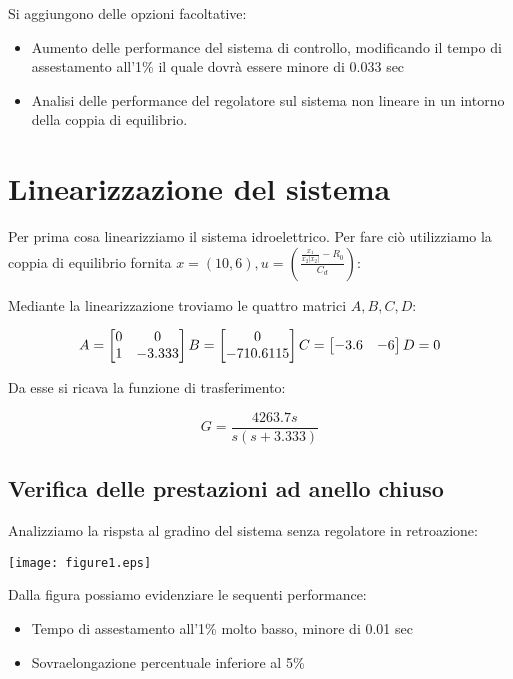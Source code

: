 \documentclass{article}
\begin{document}
Si aggiungono delle opzioni facoltative:
\begin{itemize}
    \item Aumento delle performance del sistema di controllo, modificando il tempo di assestamento all'1\% il quale dovrà essere minore di 0.033 sec
    \item Analisi delle performance del regolatore sul sistema non lineare in un intorno della coppia di equilibrio.
\end{itemize}

\section{Linearizzazione del sistema}

Per prima cosa linearizziamo il sistema idroelettrico. Per fare ciò utilizziamo la coppia di equilibrio fornita $x=(10,6), u=(\frac{\frac{x_1}{x_2 |x_2|}-R_0}{C_d})$:

Mediante la linearizzazione troviamo le quattro matrici $A,B,C,D$:

$$
A=
\begin{bmatrix}
    0 & 0\\
    1 & -3.333
\end{bmatrix}
B=
\begin{bmatrix}
    0\\
    -710.6115
\end{bmatrix}\\
C=
\begin{bmatrix}
    -3.6 & -6
\end{bmatrix}
D=0
$$

Da esse si ricava la funzione di trasferimento:

$$
G=\frac{4263.7 s}{s (s+3.333)}
$$

\subsection{Verifica delle prestazioni ad anello chiuso}

Analizziamo la rispsta al gradino del sistema senza regolatore in retroazione:

\begin{center}
    \texttt{[image: figure1.eps]}
\end{center}

Dalla figura possiamo evidenziare le sequenti performance:

\begin{itemize}
    \item Tempo di assestamento all'1\% molto basso, minore di 0.01 sec
    \item Sovraelongazione percentuale inferiore al 5\%
\end{itemize}
\end{document}
